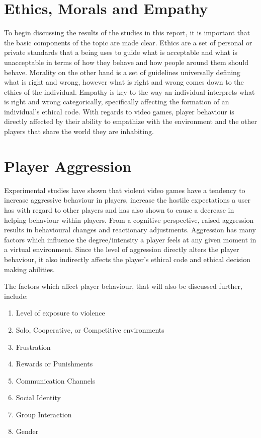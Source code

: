 \documentclass[12pt]{report}
\begin{document}
\section{Ethics, Morals and Empathy}
To begin discussing the results of the studies in this report, it is important that the basic components of the topic are made clear. Ethics are a set of personal or private standards that a being uses to guide what is acceptable and what is unacceptable in terms of how they behave and how people around them should behave.\cite{Ethical_Choices_in_Fable_3} Morality on the other hand is a set of guidelines universally defining what is right and wrong, however what is right and wrong comes down to the ethics of the individual.\cite{Wiki_Morality} Empathy is key to the way an individual interprets what is right and wrong categorically, specifically affecting the formation of an individual's ethical code. With regards to video games, player behaviour is directly affected by their ability to empathize with the environment and the other players that share the world they are inhabiting.

\section{Player Aggression}
Experimental studies have shown that violent video games have a tendency to increase aggressive behaviour in players, increase the hostile expectations a user has with regard to other players and has also shown to cause a decrease in helping behaviour within players.\cite{Exposure_to_violence_in_videogames} From a cognitive perspective, raised aggression results in behavioural changes and reactionary adjustments. Aggression has many factors which influence the degree/intensity a player feels at any given moment in a virtual environment. Since the level of aggression directly alters the player behaviour, it also indirectly affects the player's ethical code and ethical decision making abilities. 

The factors which affect player behaviour, that will also be discussed further, include:
\begin{enumerate}
\item Level of exposure to violence
\item Solo, Cooperative, or Competitive environments
\item Frustration
\item Rewards or Punishments
\item Communication Channels
\item Social Identity
\item Group Interaction
\item Gender
\end{enumerate}
\end{document}

